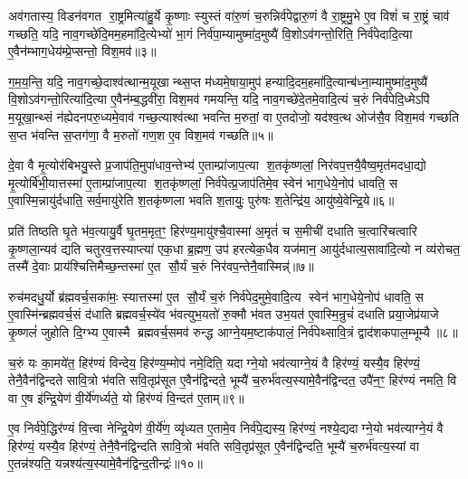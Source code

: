 अव॑गतास्य॒ विडन॑वगत रा॒ष्ट्रमित्या॑हु॒र्ये कृ॒ष्णाः स्युस्तं वा॑रु॒णं च॒रुन्निर्व॑पेद्वारु॒णं वै रा॒ष्ट्रमु॒भे ए॒व विशं॑ च रा॒ष्ट्रं चाव॑ गच्छति॒ यदि॒ नाव॒गच्छे॑दि॒मम॒हमा॑दि॒त्येभ्यो॑ भा॒गं निर्व॑पा॒म्यामुष्मा॑द॒मुष्यै॑ वि॒शोऽव॑गन्तो॒रिति॒ निर्व॑पेदादि॒त्या ए॒वैन॑म्भाग॒धेय॑म्प्रे॒प्सन्तो॒ विश॒मव॑॥३॥

ग॒म॒य॒न्ति॒ यदि॒ नाव॒गच्छे॒दाश्व॑त्थान्म॒यूखान्थ्स॒प्त म॑ध्यमे॒षाया॒मुप॑ हन्यादि॒दम॒हमा॑दि॒त्यान्ब॑ध्ना॒म्यामुष्मा॑द॒मुष्यै॑ वि॒शोऽव॑गन्तो॒रित्या॑दि॒त्या ए॒वैन॑म्ब॒द्धवी॑रा॒ विश॒मव॑ गमयन्ति॒ यदि॒ नाव॒गच्छे॑दे॒तमे॒वादि॒त्यं च॒रुं निर्व॑पेदि॒ध्मेऽपि॑ म॒यूखा॒न्थ्सं न॑ह्येदनपरु॒ध्यमे॒वाव॑ गच्छ॒त्याश्व॑त्था भवन्ति म॒रुतां॒ वा ए॒तदोजो॒ यद॑श्व॒त्थ ओज॑सै॒व विश॒मव॑ गच्छति स॒प्त भ॑वन्ति स॒प्तग॑णा॒ वै म॒रुतो॑ गण॒श ए॒व विश॒मव॑ गच्छति॥५॥

{\anuvakamend[{धा॒रय॑द्वतो मरुतो गच्छति॒ विश॒मवै॒तद॒ष्टाद॑श च॥१॥}]}

दे॒वा वै मृ॒त्योर॑बिभयु॒स्ते प्र॒जाप॑ति॒मुपा॑धाव॒न्तेभ्य॑ ए॒ताम्प्रा॑जाप॒त्या श॒तकृ॑ष्णलां॒ निर॑वप॒त्तयै॒वैष्व॒मृत॑मदधा॒द्यो मृ॒त्योर्बि॑भी॒यात्तस्मा॑ ए॒ताम्प्रा॑जाप॒त्या श॒तकृ॑ष्णलां॒ निर्व॑पेत्प्र॒जाप॑तिमे॒व स्वेन॑ भाग॒धेये॒नोप॑ धावति॒ स ए॒वास्मि॒न्नायु॑र्दधाति॒ सर्व॒मायु॑रेति श॒तकृ॑ष्णला भवति श॒तायुः॒ पुरु॑षः श॒तेन्द्रि॑य॒ आयु॑ष्ये॒वेन्द्रि॒ये॥६॥

प्रति॑ तिष्ठति घृ॒ते भ॑व॒त्यायु॒र्वै घृ॒तम॒मृत॒ꣳ॒ हिर॑ण्य॒मायु॑श्चै॒वास्मा॑ अ॒मृतं॑ च स॒मीची॑ दधाति च॒त्वारि॑चत्वारि कृ॒ष्णला॒न्यव॑ द्यति चतुरव॒त्तस्याप्त्या॑ एक॒धा ब्र॒ह्मण॒ उप॑ हरत्येक॒धैव यज॑मान॒ आयु॑र्दधात्य॒सावा॑दि॒त्यो न व्य॑रोचत॒ तस्मै॑ दे॒वाः प्राय॑श्चित्तिमैच्छ॒न्तस्मा॑ ए॒त सौ॒र्यं च॒रुं निर॑वप॒न्तेनै॒वास्मिन्न्॑॥७॥

रुच॑मदधु॒र्यो ब्र॑ह्मवर्च॒सका॑मः॒ स्यात्तस्मा॑ ए॒त सौ॒र्यं च॒रुं निर्व॑पेद॒मुमे॒वादि॒त्य स्वेन॑ भाग॒धेये॒नोप॑ धावति॒ स ए॒वास्मि॑न्ब्रह्मवर्च॒सं द॑धाति ब्रह्मवर्च॒स्ये॑व भ॑वत्युभ॒यतो॑ रु॒क्मौ भ॑वत उभ॒यत॑ ए॒वास्मि॒न्रुचं॑ दधाति प्रया॒जेप्र॑याजे कृ॒ष्णलं॑ जुहोति दि॒ग्भ्य ए॒वास्मै ब्रह्मवर्च॒समव॑ रुन्द्ध आग्ने॒यम॒ष्टाक॑पालं॒ निर्व॑पेथ्सावि॒त्रं द्वाद॑शकपाल॒म्भूम्यै॥८॥

च॒रुं यः का॒मये॑त॒ हिर॑ण्यं विन्देय॒ हिर॑ण्य॒म्मोप॑ नमे॒दिति॒ यदाग्ने॒यो भव॑त्याग्ने॒यं वै हिर॑ण्यं॒ यस्यै॒व हिर॑ण्यं॒ तेनै॒वैन॑द्विन्दते सावि॒त्रो भ॑वति सवि॒तृप्र॑सूत ए॒वैन॑द्विन्दते॒ भूम्यै॑ च॒रुर्भ॑वत्य॒स्यामे॒वैन॑द्विन्दत॒ उपै॑न॒ꣳ॒ हिर॑ण्यं नमति॒ वि वा ए॒ष इ॑न्द्रि॒येण॑ वी॒र्ये॑णर्ध्यते॒ यो हिर॑ण्यं वि॒न्दत॑ ए॒ताम्॥९॥

ए॒व निर्व॑पे॒द्धिर॑ण्यं वि॒त्त्वा नेन्द्रि॒येण॑ वी॒र्ये॑ण॒ व्यृ॑ध्यत ए॒तामे॒व निर्व॑पे॒द्यस्य॒ हिर॑ण्यं॒ नश्ये॒द्यदाग्ने॒यो भव॑त्याग्ने॒यं वै हिर॑ण्यं॒ यस्यै॒व हिर॑ण्यं॒ तेनै॒वैन॑द्विन्दति सावि॒त्रो भ॑वति सवि॒तृप्र॑सूत ए॒वैन॑द्विन्दति॒ भूम्यै॑ च॒रुर्भ॑वत्य॒स्यां वा ए॒तन्न॑श्यति॒ यन्नश्य॑त्य॒स्यामे॒वैन॑द्विन्द॒तीन्द्रः॑॥१०॥

